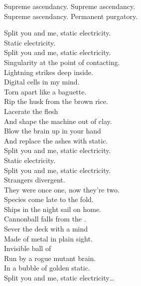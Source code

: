 Supreme ascendancy. Supreme ascendancy. \\
Supreme ascendancy. Permanent purgatory. \\





Split you and me, static electricity. \\
Static electricity. \\
Split you and me, static electricity. \\

Singularity at the point of contacting. \\
Lightning strikes deep inside. \\
Digital cells in my mind. \\
Torn apart like a baguette. \\
Rip the husk from the brown rice. \\
Lacerate the  flesh \\
And shape the machine out of clay. \\
Blow the brain up in your hand \\
And replace the ashes with static. \\

Split you and me, static electricity. \\
Static electricity. \\
Split you and me, static electricity. \\

Strangers divergent. \\
They were once one, now they're two. \\
Species come late to the fold. \\
Ships in the night sail on home. \\
Cannonball falls from the . \\
Sever the deck with a mind \\
Made of metal in plain sight. \\
Invisible ball of  \\
Run by a rogue mutant brain. \\
In a bubble of golden static. \\

Split you and me, static electricity… \\

